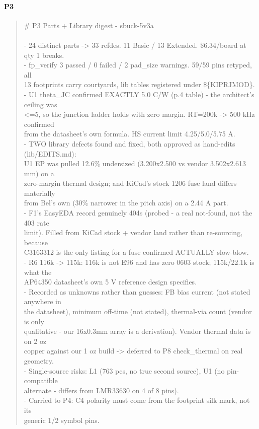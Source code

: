 \documentclass[11pt,a4paper]{article}
\begin{document}
\paragraph*{P3}
\begin{quote}\small\ttfamily\raggedright
\# P3 Parts + Library digest - sbuck-5v3a\\
~\\
- 24 distinct parts -\textgreater{} 33 refdes. 11 Basic / 13 Extended. \$6.34/board at qty 1 breaks.\\
- fp\_verify 3 passed / 0 failed / 2 pad\_size warnings. 59/59 pins retyped, all\\
  13 footprints carry courtyards, lib tables registered under \$\{KIPRJMOD\}.\\
- U1 theta\_JC confirmed EXACTLY 5.0 C/W (p.4 table) - the architect's ceiling was\\
  \textless{}=5, so the junction ladder holds with zero margin. RT=200k -\textgreater{} 500 kHz confirmed\\
  from the datasheet's own formula. HS current limit 4.25/5.0/5.75 A.\\
- TWO library defects found and fixed, both approved as hand-edits (lib/EDITS.md):\\
  U1 EP was pulled 12.6\% undersized (3.200x2.500 vs vendor 3.502x2.613 mm) on a\\
  zero-margin thermal design; and KiCad's stock 1206 fuse land differs materially\\
  from Bel's own (30\% narrower in the pitch axis) on a 2.44 A part.\\
- F1's EasyEDA record genuinely 404s (probed - a real not-found, not the 403 rate\\
  limit). Filled from KiCad stock + vendor land rather than re-sourcing, because\\
  C3163312 is the only listing for a fuse confirmed ACTUALLY slow-blow.\\
- R6 116k -\textgreater{} 115k: 116k is not E96 and has zero 0603 stock; 115k/22.1k is what the\\
  AP64350 datasheet's own 5 V reference design specifies.\\
- Recorded as unknowns rather than guesses: FB bias current (not stated anywhere in\\
  the datasheet), minimum off-time (not stated), thermal-via count (vendor is only\\
  qualitative - our 16x0.3mm array is a derivation). Vendor thermal data is on 2 oz\\
  copper against our 1 oz build -\textgreater{} deferred to P8 check\_thermal on real geometry.\\
- Single-source risks: L1 (763 pcs, no true second source), U1 (no pin-compatible\\
  alternate - differs from LMR33630 on 4 of 8 pins).\\
- Carried to P4: C4 polarity must come from the footprint silk mark, not its\\
  generic 1/2 symbol pins.
\end{quote}
\end{document}
